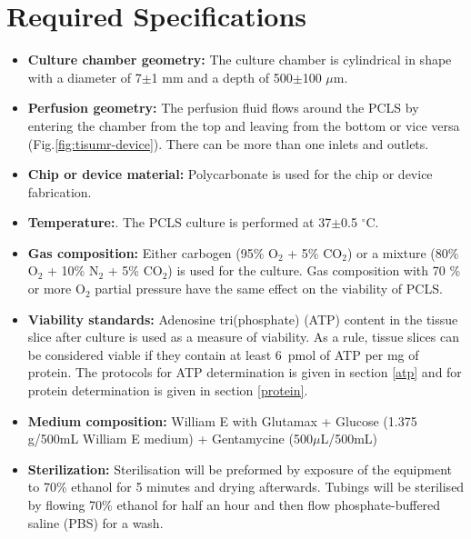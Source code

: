 \documentclass{EU-report}
\begin{document}
\section{Required Specifications}
\begin{itemize}
\item \textbf{Culture chamber geometry:} The culture chamber is cylindrical in
shape with a diameter of 7$\pm$1 mm and a depth of 500$\pm$100 $\mu$m.
\item \textbf{Perfusion geometry:} The perfusion fluid flows around the PCLS by entering the chamber from the top and leaving from the bottom or vice versa (Fig.\ref{fig:tisumr-device}). There can be more than one inlets and outlets.
\item \textbf{Chip or device material:} Polycarbonate is used for the chip or
device fabrication.
\item \textbf{Temperature:}. The PCLS culture is performed at
37$\pm$0.5 $^{\circ}$C.
\item \textbf{Gas composition:} Either carbogen (95\% O$_2$ + 5\% CO$_2$) or a mixture (80\% O$_2$ + 10\% N$_2$ + 5\% CO$_2$) is used
for the culture. Gas composition with 70 \% or more O$_2$ partial pressure have the same effect on the viability of PCLS.
\item \textbf{Viability standards:} Adenosine tri(phosphate) (ATP) content in
the tissue slice after culture is used as a measure of viability. As a rule,
tissue slices can be considered viable if they contain at least 6~pmol of ATP
per mg of protein. The protocols for ATP determination is given in section \ref{atp} and for protein determination is given in section \ref{protein}.
\item \textbf{Medium composition:} William E  with Glutamax + Glucose (1.375
g/500mL William E medium) + Gentamycine (500$\mu$L/500mL)
\item \textbf{Sterilization:} Sterilisation will be preformed by exposure of the equipment to 70\% ethanol for 5 minutes and drying afterwards. Tubings will be sterilised by flowing 70\% ethanol for half an hour and then flow phosphate-buffered saline (PBS) for a wash.
\end{itemize}
\end{document}
